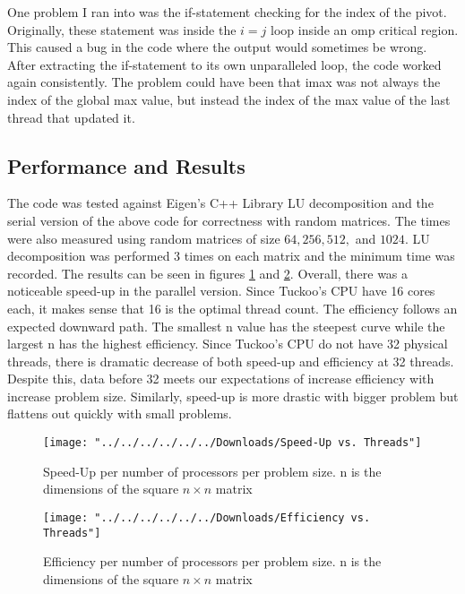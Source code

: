 \documentclass[12pt,letterpaper]{article}
\begin{document}
One problem I ran into was the if-statement checking for the index of the pivot. Originally, these statement was inside the \(i=j\) loop inside an omp critical region. This caused a bug in the code where the output would sometimes be wrong. After extracting the if-statement to its own unparalleled loop, the code worked again consistently. The problem could have been that imax was not always the index of the global max value, but instead the index of the max value of the last thread that updated it.

\subsection{Performance and Results}
The code was tested against Eigen's C++ Library LU decomposition and the serial version of the above code for correctness with random matrices. The times were also measured using random matrices of size \(64, 256, 512,\) and \(1024\). LU decomposition was performed 3 times on each matrix and the minimum time was recorded. The results can be seen in figures \ref{fig:speed-up-vs} and \ref{fig:efficiency-vs}. Overall, there was a noticeable speed-up in the parallel version. Since Tuckoo's CPU have 16 cores each, it makes sense that 16 is the optimal thread count. The efficiency follows an expected downward path. The smallest n value has the steepest curve while the largest n has the highest efficiency. Since Tuckoo's CPU do not have 32 physical threads, there is dramatic decrease of both speed-up and efficiency at 32 threads. Despite this, data before 32 meets our expectations of increase efficiency with increase problem size. Similarly, speed-up is more drastic with bigger problem but flattens out quickly with small problems.

\begin{figure}[H]
    \centering
    \texttt{[image: "../../../../../../Downloads/Speed-Up vs. Threads"]}
    \caption{Speed-Up per number of processors per problem size. n is the dimensions of the square \(n \times n\) matrix}
    \label{fig:speed-up-vs}
\end{figure}

\begin{figure}[H]
    \centering
    \texttt{[image: "../../../../../../Downloads/Efficiency vs. Threads"]}
    \caption{Efficiency per number of processors per problem size. n is the dimensions of the square \(n \times n\) matrix}
    \label{fig:efficiency-vs}
\end{figure}
\end{document}
